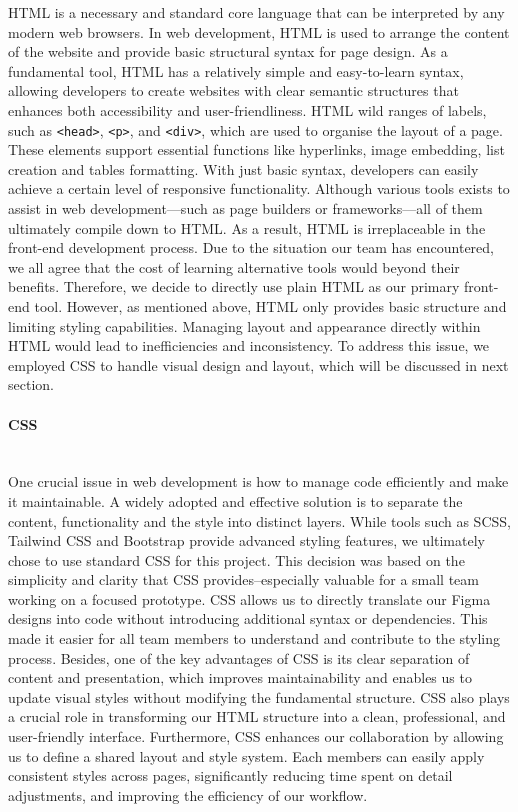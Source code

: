 HTML is a necessary and standard core language that can be interpreted by any modern web browsers. In web development, HTML is used to arrange the content of the website and provide basic structural syntax for page design. As a fundamental tool, HTML has a relatively simple and easy-to-learn syntax, allowing developers to create websites with clear semantic structures that enhances both accessibility and user-friendliness. HTML wild ranges of labels, such as \verb|<head>|, \verb|<p>|, and \verb|<div>|, which are used to organise the layout of a page. These elements support essential functions like hyperlinks, image embedding, list creation and tables formatting. With just basic syntax, developers can easily achieve a certain level of responsive functionality. Although various tools exists to assist in web development—such as page builders or frameworks—all of them ultimately compile down to HTML. As a result, HTML is irreplaceable in the front-end development process. Due to the situation our team has encountered, we all agree that the cost of learning alternative tools would beyond their benefits. Therefore, we decide to directly use plain HTML as our primary front-end tool. However, as mentioned above, HTML only provides basic structure and limiting styling capabilities. Managing layout and appearance directly within HTML would lead to inefficiencies and inconsistency. To address this issue, we employed CSS to handle visual design and layout, which will be discussed in next section. 

\paragraph{CSS}\mbox{}\\
One crucial issue in web development is how to manage code efficiently and make it maintainable. A widely adopted and effective solution is to separate the content, functionality and the style into distinct layers. While tools such as SCSS, Tailwind CSS and Bootstrap provide advanced styling features, we ultimately chose to use standard CSS for this project. This decision was based on the simplicity and clarity that CSS provides--especially valuable for a small team working on a focused prototype. CSS allows us to directly translate our Figma designs into code without introducing additional syntax or dependencies. This made it easier for all team members to understand and contribute to the styling process. Besides, one of the key advantages of CSS is its clear separation of content and presentation, which improves maintainability and enables us to update visual styles without modifying the fundamental structure. CSS also plays a crucial role in transforming our HTML structure into a clean, professional, and user-friendly interface. Furthermore, CSS enhances our collaboration by allowing us to define a shared layout and style system. Each members can easily apply consistent styles across pages, significantly reducing time spent on detail adjustments, and improving the efficiency of our workflow.

